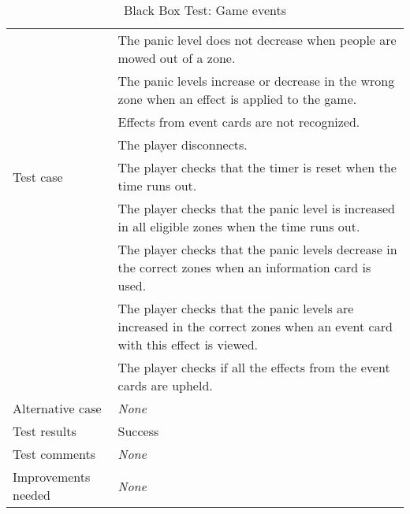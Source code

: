 {\begin{table}[H]
\begin{tabular}{| p{5cm} | p{10cm} |}
		& The panic level does not decrease when people are mowed out of a zone.\\
		& The panic levels increase or decrease in the wrong zone when an effect is applied to the game.\\
		& Effects from event cards are not recognized.\\
		& The player disconnects.\\ \hline
	Test case
		& The player checks that the timer is reset when the time runs out.\\
		& The player checks that the panic level is increased in all eligible zones when the time runs out.\\
		& The player checks that the panic levels decrease in the correct zones when an information card is used.\\
		& The player checks that the panic levels are increased in the correct zones when an event card with this effect is viewed. \\
		& The player checks if all the effects from the event cards are upheld. \\ \hline
	Alternative case
		& \emph{None}\\ \hline
	Test results 
		& Success \\ \hline
	Test comments
		& \emph{None} \\ \hline
	Improvements needed
		& \emph{None} \\ \hline
\end{tabular}


\caption{Black Box Test: Game events}
\label{fig:black_box_test_6}
\end{table}}


